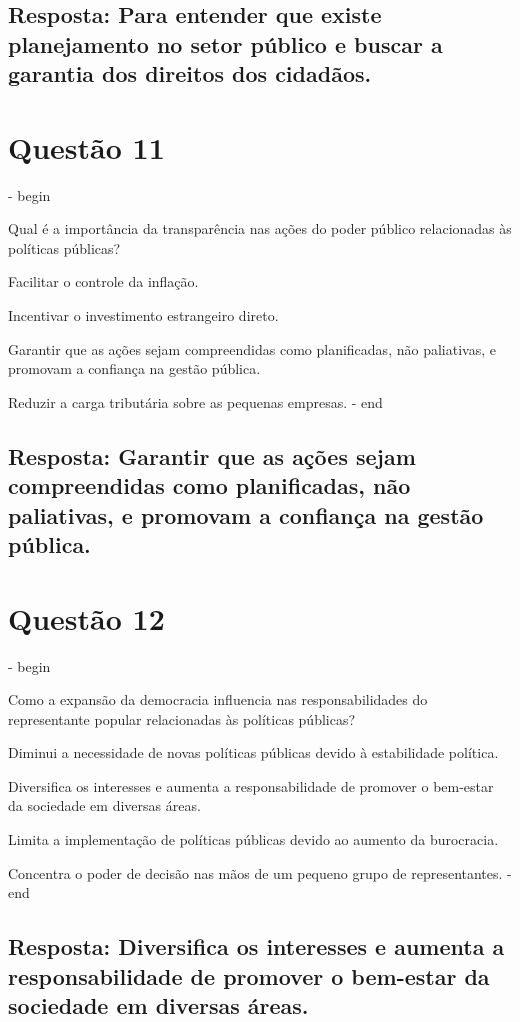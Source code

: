 \documentclass[
   article,       
   12pt,          
   oneside,       
   a4paper,       
   english,       
   brazil,        
   sumario=tradicional
   ]{abntex2}
\begin{document}
\subsection{Resposta: Para entender que existe planejamento no setor público e buscar a garantia dos direitos dos cidadãos.}

\section{Questão 11}
\itemize - begin
\item Qual é a importância da transparência nas ações do poder público relacionadas às políticas públicas?
\item Facilitar o controle da inflação.
\item Incentivar o investimento estrangeiro direto.
\item Garantir que as ações sejam compreendidas como planificadas, não paliativas, e promovam a confiança na gestão pública.
\item Reduzir a carga tributária sobre as pequenas empresas.
\itemize - end
\subsection{Resposta: Garantir que as ações sejam compreendidas como planificadas, não paliativas, e promovam a confiança na gestão pública.}

\section{Questão 12}
\itemize - begin
\item Como a expansão da democracia influencia nas responsabilidades do representante popular relacionadas às políticas públicas?
\item Diminui a necessidade de novas políticas públicas devido à estabilidade política.
\item Diversifica os interesses e aumenta a responsabilidade de promover o bem-estar da sociedade em diversas áreas.
\item Limita a implementação de políticas públicas devido ao aumento da burocracia.
\item Concentra o poder de decisão nas mãos de um pequeno grupo de representantes.
\itemize - end
\subsection{Resposta: Diversifica os interesses e aumenta a responsabilidade de promover o bem-estar da sociedade em diversas áreas.}
\end{document}
